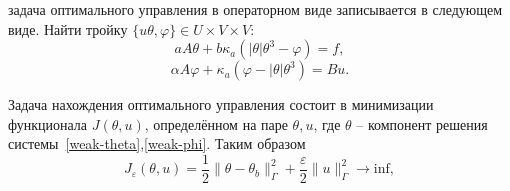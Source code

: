 \documentclass[10pt]{article}
\begin{document}
    задача оптимального управления в операторном виде записывается в следующем виде.
    Найти тройку $\{u \theta, \varphi \} \in U \times V \times V$:
    \begin{equation}
        \label{weak-theta}
        a A \theta + b \kappa_a (| \theta | \theta^3 - \varphi ) = f,
    \end{equation}
    \begin{equation}
        \label{weak-phi}
        \alpha A \varphi + \kappa_a (\varphi - |\theta|\theta^3)  = Bu.
    \end{equation}

    Задача нахождения оптимального управления состоит в минимизации функционала $J(\theta, u)$,
    определённом на паре $\theta, u$, где $\theta$ -- компонент
    решения системы~\eqref{weak-theta},\eqref{weak-phi}.
    Таким образом
    \begin{equation}
        \label{minimization-operational}
        J_\varepsilon(\theta, u) = \frac{1}{2}\|\theta -\theta_b\|^2_\Gamma
        + \frac{\varepsilon}{2}\|u\|^2_\Gamma \rightarrow \text{inf},
    \end{equation}
\end{document}
